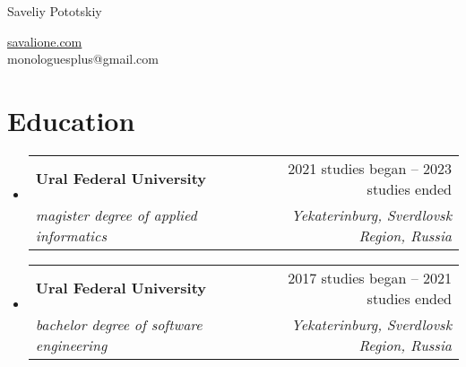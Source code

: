 \documentclass[letterpaper,11pt]{article}
\makeatletter
\newcommand{\resumeItem}[1]{
    \item{
                {#1 \vspace{-4pt}}
          }
}
\newcommand{\resumeSubheading}[4]{
    \vspace{-2pt}\item
    \begin{tabular*}{0.97\textwidth}[t]{l@{\extracolsep{\fill}}r}
        \textbf{#1} & #2 \\
        \textit{\small #3} & \textit{\small #4} \\
    \end{tabular*}\vspace{-10pt}
}
\newcommand{\resumeSubHeadingListStart}{\begin{itemize}[leftmargin=0.15in, label={}]}
\newcommand{\resumeSubHeadingListEnd}{\end{itemize}}
\newcommand{\resumeItemListStart}{\begin{itemize}}
\newcommand{\resumeItemListEnd}{\end{itemize}\vspace{-2pt}}
\makeatother
\begin{document}
\begin{center}
    {\LARGE Saveliy Pototskiy} \\ \vspace{0pt}
    \begin{multicols}{2}
        \begin{flushleft}
        \end{flushleft}

        \begin{flushright}
            \href{https://savalione.com}{savalione.com} \\

            \href{mailto:{monologuesplus@gmail.com}} \large{monologuesplus@gmail.com}
        \end{flushright}
    \end{multicols}
\end{center}

\section{Education}
\resumeSubHeadingListStart

\resumeSubheading
    {Ural Federal University}{2021 studies began -- 2023 studies ended}
    {magister degree of applied informatics}{Yekaterinburg, Sverdlovsk Region, Russia}
\resumeSubheading
    {Ural Federal University}{2017 studies began -- 2021 studies ended}
    {bachelor degree of software engineering}{Yekaterinburg, Sverdlovsk Region, Russia}

\resumeSubHeadingListEnd


\end{document}
